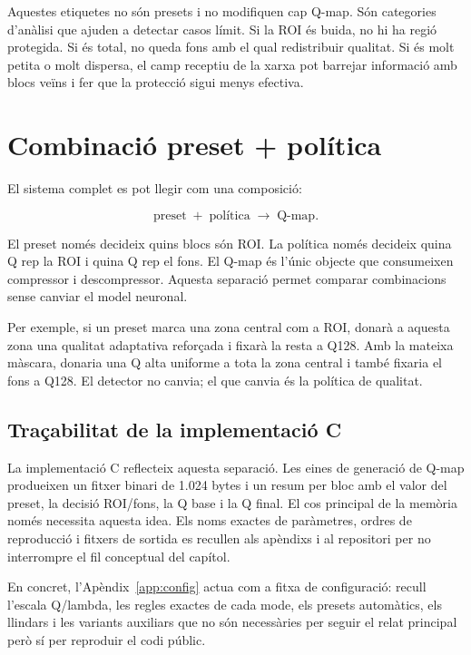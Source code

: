 Aquestes etiquetes no són presets i no modifiquen cap Q-map. Són categories
d'anàlisi que ajuden a detectar casos límit. Si la ROI és buida, no hi ha regió
protegida. Si és total, no queda fons amb el qual redistribuir qualitat. Si és
molt petita o molt dispersa, el camp receptiu de la xarxa pot barrejar informació
amb blocs veïns i fer que la protecció sigui menys efectiva.

\section{Combinació preset + política}\label{sec:control_decision}

El sistema complet es pot llegir com una composició:

\begin{equation}
\text{preset}
\;+\;
\text{política}
\;\longrightarrow\;
\text{Q-map}.
\end{equation}

El preset només decideix quins blocs són ROI. La política només decideix quina Q
rep la ROI i quina Q rep el fons. El Q-map és l'únic objecte que consumeixen
compressor i descompressor. Aquesta separació permet comparar combinacions sense
canviar el model neuronal.

Per exemple, si un preset marca una zona central com a ROI, 
donarà a aquesta zona una qualitat adaptativa reforçada i fixarà la resta a
Q128. Amb la mateixa màscara,  donaria una Q alta uniforme a
tota la zona central i també fixaria el fons a Q128. El detector no canvia; el
que canvia és la política de qualitat.

\subsection{Traçabilitat de la implementació C}\label{sec:interface_c}

La implementació C reflecteix aquesta separació. Les eines de generació de Q-map
produeixen un fitxer binari de 1.024 bytes i un resum per bloc amb el valor del
preset, la decisió ROI/fons, la Q base i la Q final. El cos principal de la
memòria només necessita aquesta idea. Els noms exactes de paràmetres, ordres de
reproducció i fitxers de sortida es recullen als apèndixs i al repositori per no
interrompre el fil conceptual del capítol.

En concret, l'Apèndix~\ref{app:config} actua com a fitxa de configuració:
recull l'escala Q/lambda, les regles exactes de cada mode, els presets
automàtics, els llindars i les variants auxiliars que no són necessàries per
seguir el relat principal però sí per reproduir el codi públic.

